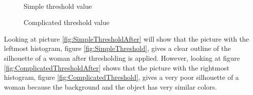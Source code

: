 \begin{figure}[htbp]
\begin{minipage}[b]{0.45\textwidth}
\end{minipage} \\ %
\begin{minipage}[t]{0.45\textwidth}
\caption{Simple threshold value} %
\label{fig:SimpleThreshold}
\end{minipage} \hfill
\begin{minipage}[t]{0.45\textwidth}
\caption{Complicated threshold value} %
\label{fig:ComplicatedThreshold}
\end{minipage}
\end{figure}

Looking at picture \eqref{fig:SimpleThresholdAfter} will show that the picture with the leftmost histogram, figure \eqref{fig:SimpleThreshold}, gives a clear outline of the silhouette of a woman after thresholding is applied. However, looking at figure \eqref{fig:ComplicatedThresholdAfter} shows that the picture with the rightmost histogram, figure \eqref{fig:ComplicatedThreshold}, gives a very poor silhouette of a woman because the background and the object has very similar colors. 


